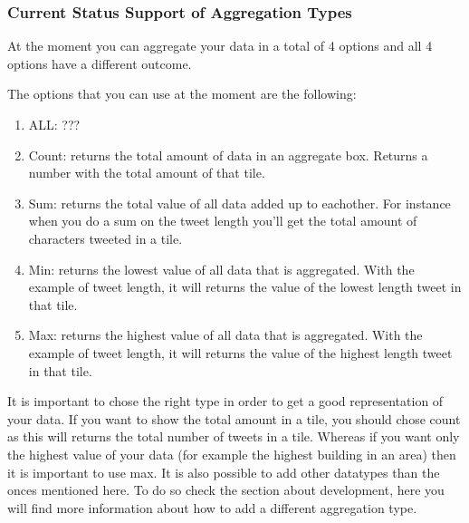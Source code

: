 \subsubsection{Current Status Support of Aggregation Types}
At the moment you can aggregate your data in a total of 4 options and all 4 options have a different outcome.

The options that you can use at the moment are the following:
\begin{enumerate}
\item ALL: 	???
\item Count: returns the total amount of data in an aggregate box. Returns a number with the total amount of that tile.
\item Sum: returns the total value of all data added up to eachother. For instance when you do a sum on the tweet length you'll get the total amount of characters tweeted in a tile.
\item Min: returns the lowest value of all data that is aggregated. With the example of tweet length, it will returns the value of the lowest length tweet in that tile.
\item Max: returns the highest value of all data that is aggregated. With the example of tweet length, it will returns the value of the highest length tweet in that tile.
\end{enumerate}

It is important to chose the right type in order to get a good representation of your data. If you want to show the total amount in a tile, you should chose count as this will returns the total number of tweets in a tile. Whereas if you want only the highest value of your data (for example the highest building in an area) then it is important to use max. It is also possible to add other datatypes than the onces mentioned here. To do so check the section about development, here you will find more information about how to add a different aggregation type.
